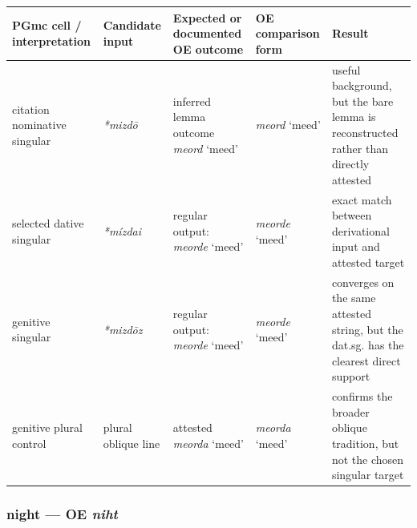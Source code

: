 \documentclass[
  british,
  a4paper,
]{article}
\newcounter{none} %
\begin{document}
{\def\LTcaptype{none} %
\begin{longtable}[]{@{}
  >{\raggedright\arraybackslash}p{}
  >{\raggedright\arraybackslash}p{}
  >{\raggedright\arraybackslash}p{}
  >{\raggedright\arraybackslash}p{}
  >{\raggedright\arraybackslash}p{}@{}}
\toprule\noalign{}
\begin{minipage}[b]{\linewidth}\raggedright
PGmc cell / interpretation
\end{minipage} & \begin{minipage}[b]{\linewidth}\raggedright
Candidate input
\end{minipage} & \begin{minipage}[b]{\linewidth}\raggedright
Expected or documented OE outcome
\end{minipage} & \begin{minipage}[b]{\linewidth}\raggedright
OE comparison form
\end{minipage} & \begin{minipage}[b]{\linewidth}\raggedright
Result
\end{minipage} \\
\midrule\noalign{}
\endhead
\bottomrule\noalign{}
\endlastfoot
citation nominative singular & {\emph{*mizdō}} & inferred lemma outcome
{\emph{meord}} `meed' & {\emph{meord}} `meed' & useful background, but
the bare lemma is reconstructed rather than directly attested \\
selected dative singular & {\emph{*mízdai}} & regular output:
{\emph{meorde}} `meed' & {\emph{meorde}} `meed' & exact match between
derivational input and attested target \\
genitive singular & {\emph{*mizdōz}} & regular output: {\emph{meorde}}
`meed' & {\emph{meorde}} `meed' & converges on the same attested string,
but the dat.sg. has the clearest direct support \\
genitive plural control & plural oblique line & attested {\emph{meorda}}
`meed' & {\emph{meorda}} `meed' & confirms the broader oblique
tradition, but not the chosen singular target \\
\end{longtable}
}

\subsubsection{\texorpdfstring{night --- OE
\emph{niht}}{night --- OE niht}}\label{night-oe-niht}
\end{document}
